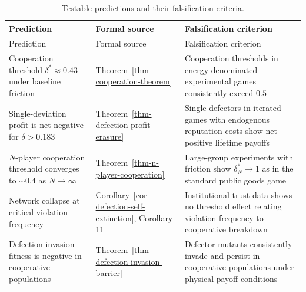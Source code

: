 \documentclass[11pt]{article}
\theoremstyle{plain}
\theoremstyle{definition}
\theoremstyle{remark}
\begin{document}
\begin{longtable}[]{@{}
  >{\raggedright\arraybackslash}p{}
  >{\raggedright\arraybackslash}p{}
  >{\raggedright\arraybackslash}p{}@{}}
\caption{Testable predictions and their falsification
criteria.}\tabularnewline
\toprule\noalign{}
\begin{minipage}[b]{\linewidth}\raggedright
Prediction
\end{minipage} & \begin{minipage}[b]{\linewidth}\raggedright
Formal source
\end{minipage} & \begin{minipage}[b]{\linewidth}\raggedright
Falsification criterion
\end{minipage} \\
\midrule\noalign{}
\endfirsthead
\toprule\noalign{}
\begin{minipage}[b]{\linewidth}\raggedright
Prediction
\end{minipage} & \begin{minipage}[b]{\linewidth}\raggedright
Formal source
\end{minipage} & \begin{minipage}[b]{\linewidth}\raggedright
Falsification criterion
\end{minipage} \\
\midrule\noalign{}
\endhead
\bottomrule\noalign{}
\endlastfoot
Cooperation threshold \(\delta^* \approx 0.43\) under baseline friction
& Theorem~\ref{thm-cooperation-theorem} & Cooperation thresholds in
energy-denominated experimental games consistently exceed \(0.5\) \\
Single-deviation profit is net-negative for \(\delta > 0.183\) &
Theorem~\ref{thm-defection-profit-erasure} & Single defectors in
iterated games with endogenous reputation costs show net-positive
lifetime payoffs \\
\(N\)-player cooperation threshold converges to \(\sim 0.4\) as
\(N \to \infty\) & Theorem~\ref{thm-n-player-cooperation} & Large-group
experiments with friction show \(\delta_N^* \to 1\) as in the standard
public goods game \\
Network collapse at critical violation frequency &
Corollary~\ref{cor-defection-self-extinction}, Corollary 11
\citep{TC-IV} & Institutional-trust data shows no threshold effect
relating violation frequency to cooperative breakdown \\
Defection invasion fitness is negative in cooperative populations &
Theorem~\ref{thm-defection-invasion-barrier} & Defector mutants
consistently invade and persist in cooperative populations under
physical payoff conditions \\
\end{longtable}
\end{document}
